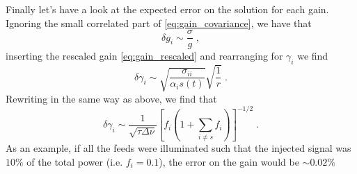 \documentclass[oldfontcommands,letter,11pt,oneside,article]{memoir}
\begin{document}
Finally let's have a look at the expected error on the solution for each gain.
Ignoring the small correlated part of \eqref{eq:gain_covariance}, we have that
\begin{equation}
    \delta{g}_i \sim \frac{\sigma}{g} \; ,
\end{equation}
inserting the rescaled gain \eqref{eq:gain_rescaled} and rearranging for $\gamma_i$ we find
\begin{equation}
    \delta{\gamma}_i \sim \sqrt{\frac{\sigma_{ii}}{\alpha_i s(t)}} \sqrt{\frac{1}{r}} \; .
\end{equation}
Rewriting in the same way as above, we find that
\begin{equation}
    \delta{\gamma}_i \sim \frac{1}{\sqrt{\tau \Delta\nu}} \left[f_i \left(1 + \sum_{i \ne s} f_i \right) \right]^{-1/2} \; .
\end{equation}
As an example, if all the feeds were illuminated such that the injected signal
was $10 \%$ of the total power (i.e. $f_i = 0.1$), the error on the gain would
be $\sim 0.02 \%$
\end{document}
